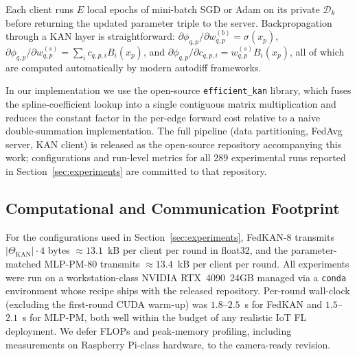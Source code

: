 Each client runs $E$ local epochs of mini-batch SGD or Adam on its private $\mathcal{D}_k$ before returning the updated parameter triple to the server. Backpropagation through a KAN layer is straightforward: $\partial \phi_{q,p}/\partial w^{(b)}_{q,p} = \sigma(x_p)$, $\partial \phi_{q,p}/\partial w^{(s)}_{q,p} = \sum_i c_{q,p,i} B_i(x_p)$, and $\partial \phi_{q,p}/\partial c_{q,p,i} = w^{(s)}_{q,p} B_i(x_p)$, all of which are computed automatically by modern autodiff frameworks.

In our implementation we use the open-source \texttt{efficient\_kan} library, which fuses the spline-coefficient lookup into a single contiguous matrix multiplication and reduces the constant factor in the per-edge forward cost relative to a naive double-summation implementation. The full pipeline (data partitioning, FedAvg server, KAN client) is released as the open-source repository accompanying this work; configurations and run-level metrics for all $289$ experimental runs reported in Section~\ref{sec:experiments} are committed to that repository.

\subsection{Computational and Communication Footprint}\label{subsec:cost}

For the configurations used in Section~\ref{sec:experiments}, FedKAN-8 transmits $|\Theta_{\text{KAN}}| \cdot 4$ bytes $\approx 13.1$~kB per client per round in float32, and the parameter-matched MLP-PM-80 transmits $\approx 13.4$~kB per client per round. All experiments were run on a workstation-class NVIDIA RTX~4090~24GB managed via a \texttt{conda} environment whose recipe ships with the released repository. Per-round wall-clock (excluding the first-round CUDA warm-up) was $1.8$--$2.5$~s for FedKAN and $1.5$--$2.1$~s for MLP-PM, both well within the budget of any realistic IoT FL deployment. We defer FLOPs and peak-memory profiling, including measurements on Raspberry Pi-class hardware, to the camera-ready revision.
